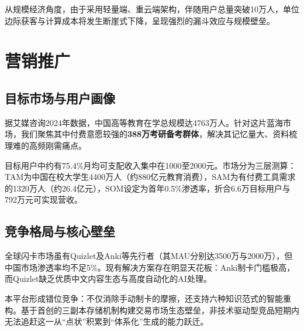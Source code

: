 \begin{table}[htbp]
    \centering
    \caption{LumaMemo服务交付核心流程}
\end{table}

从规模经济角度，由于采用轻量端、重云端架构，伴随用户总量突破10万人，单位边际获客与计算成本将发生断崖式下降，呈现强烈的漏斗效应与规模壁垒。

\section{营销推广}

\subsection{目标市场与用户画像}

据艾媒咨询2024年数据，中国高等教育在学总规模达4763万人。针对这片蓝海市场，我们聚焦其中付费意愿较强的\textbf{388万考研备考群体}，解决其记忆量大、资料梳理难的高频刚需痛点。

目标用户中约有75.4\%月均可支配收入集中在1000至2000元。市场分为三层测算：TAM为中国在校大学生4400万人（约880亿元教育消费），SAM为有付费工具需求的1320万人（约26.4亿元），SOM设定为首年0.5\%渗透率，折合6.6万目标用户与792万元可实现营收。

\subsection{竞争格局与核心壁垒}

全球闪卡市场虽有Quizlet及Anki等先行者（其MAU分别达3500万与2000万），但中国市场渗透率均不足5\%。现有解决方案存在明显天花板：Anki制卡门槛极高，而Quizlet缺乏优质中文内容生态与高度自动化的AI处理。

本平台形成错位竞争：不仅消除手动制卡的摩擦，还支持六种知识范式的智能重构。基于首创的三副本存储机制构建交易市场生态壁垒，非技术驱动型竞品短期内无法追赶这一从“点状”积累到“体系化”生成的能力跃迁。

